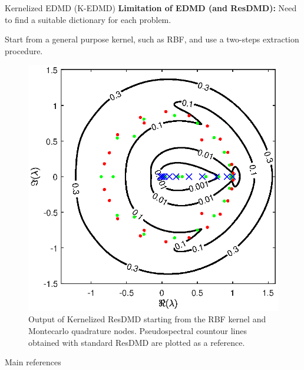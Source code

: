 \documentclass{beamer}
\begin{document}
\begin{frame}{Kernelized EDMD (K-EDMD)}
\alert{\textbf{Limitation of EDMD (and ResDMD):}} Need to find a suitable dictionary for each problem.

\medskip
{} Start from a general purpose kernel, such as RBF, and use a two-steps extraction procedure.
\begin{figure}[h]
    \begin{center}
        \includegraphics[width=0.50\linewidth]{../code/figures/gauss_map/kernelized/presentation.eps}
    \end{center}
    \caption{Output of Kernelized ResDMD starting from the RBF kernel and Montecarlo quadrature nodes. Pseudospectral countour lines obtained with standard ResDMD are plotted as a reference.}
\end{figure}
\end{frame}
\begin{frame}{Main references}
\nocite{*}
\printbibliography
\end{frame}
\end{document}
